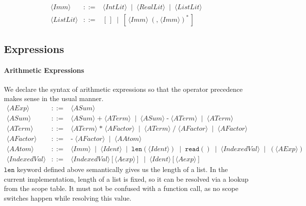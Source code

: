 \documentclass{article}
\begin{document}
\[
\begin{array}{rcl}
\langle \mathit{Imm} \rangle
&::=&
\langle \mathit{IntLit} \rangle
\;\mid\;
\langle \mathit{RealLit} \rangle
\;\mid\;
\langle \mathit{ListLit} \rangle \\[4pt]

\langle \mathit{ListLit} \rangle
&::=&
[\,]
\;\mid\;
[\,\langle \mathit{Imm} \rangle\;(\texttt{,}\;\langle \mathit{Imm} \rangle)^*\,]
\end{array}
\]

\subsection{Expressions}

\paragraph{Arithmetic Expressions} 
We declare the syntax of arithmetic expressions so that the operator precedence makes sense in the usual manner.
\[
\begin{array}{rcl}
\langle \mathit{AExp} \rangle
&::=&
\langle \mathit{ASum} \rangle \\[4pt]

\langle \mathit{ASum} \rangle
&::=&
\langle \mathit{ASum} \rangle\;\texttt{+}\;\langle \mathit{ATerm} \rangle
\;\mid\;
\langle \mathit{ASum} \rangle\;\texttt{-}\;\langle \mathit{ATerm} \rangle
\;\mid\;
\langle \mathit{ATerm} \rangle \\[4pt]

\langle \mathit{ATerm} \rangle
&::=&
\langle \mathit{ATerm} \rangle\;\texttt{*}\;\langle \mathit{AFactor} \rangle
\;\mid\;
\langle \mathit{ATerm} \rangle\;\texttt{/}\;\langle \mathit{AFactor} \rangle
\;\mid\;
\langle \mathit{AFactor} \rangle \\[4pt]

\langle \mathit{AFactor} \rangle
&::=&
\texttt{-}\;\langle \mathit{AFactor} \rangle
\;\mid\;
\langle \mathit{AAtom} \rangle \\[4pt]

\langle \mathit{AAtom} \rangle
&::=&
\langle \mathit{Imm} \rangle
\;\mid\;
\langle \mathit{Ident} \rangle
\;\mid\;
\mathtt{len}(\langle \mathit{Ident} \rangle)
\;\mid\;
\mathtt{read()} 
\;\mid\;
\langle \mathit{IndexedVal} \rangle
\;\mid\;
(\langle \mathit{AExp} \rangle) \\[4pt]

\langle \mathit{IndexedVal} \rangle
&::=&
\langle \mathit{IndexedVal} \rangle [\langle \mathit{Aexp} \rangle]
\;\mid\;
\langle \mathit{Ident} \rangle [\langle \mathit{Aexp} \rangle]
\end{array}
\]
$\mathtt{len}$ keyword defined above semantically gives us the length of a list. In the current implementation, length of a list is fixed, so it can be resolved via a lookup from the scope table. It must not be confused with a function call, as no scope switches happen while resolving this value.
\end{document}
